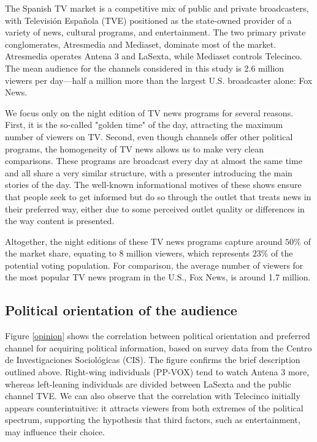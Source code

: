 \documentclass[12pt]{article}
\begin{document}
	
	
	
	
	
	
	
	The Spanish TV market is a competitive mix of public and private broadcasters, with Televisión Española (TVE) positioned as the state-owned provider of a variety of news, cultural programs, and entertainment. The two primary private conglomerates, Atresmedia and Mediaset, dominate most of the market. Atresmedia operates Antena 3 and LaSexta, while Mediaset controls Telecinco. The mean audience for the channels considered in this study is 2.6 million viewers per day—half a million more than the largest U.S. broadcaster alone: Fox News.
	
	We focus only on the night edition of TV news programs for several reasons. First, it is the so-called "golden time" of the day, attracting the maximum number of viewers on TV. Second, even though channels offer other political programs, the homogeneity of TV news allows us to make very clean comparisons. These programs are broadcast every day at almost the same time and all share a very similar structure, with a presenter introducing the main stories of the day. The well-known informational motives of these shows ensure that people seek to get informed but do so through the outlet that treats news in their preferred way, either due to some perceived outlet quality or differences in the way content is presented.
	
	Altogether, the night editions of these TV news programs capture around $50\%$ of the market share, equating to 8 million viewers, which represents $23\%$ of the potential voting population. For comparison, the average number of viewers for the most popular TV news program in the U.S., Fox News, is around 1.7 million.
	
	
	
	
	
	
	
	\subsection{Political orientation of the audience }
	
	
	Figure \ref{opinion} shows the correlation between political orientation and preferred channel for acquiring political information, based on survey data from the Centro de Investigaciones Sociológicas (CIS). The figure confirms the brief description outlined above. Right-wing individuals (PP-VOX) tend to watch Antena 3 more, whereas left-leaning individuals are divided between LaSexta and the public channel TVE. We can also observe that the correlation with Telecinco initially appears counterintuitive: it attracts viewers from both extremes of the political spectrum, supporting the hypothesis that third factors, such as entertainment, may influence their choice.
	
\end{document}
